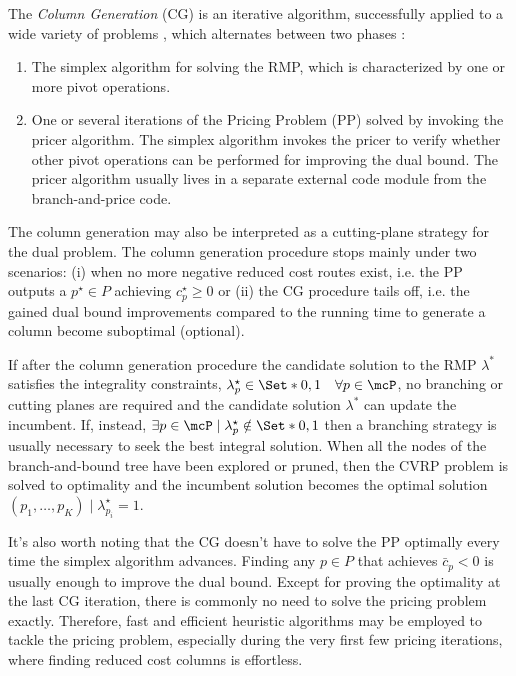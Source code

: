\medskip

The \textit{Column Generation} (CG) is an iterative algorithm,
successfully applied to a wide variety of problems \parencite{desrosiers2005},
which alternates between two phases \parencite{desaulniers2018}:
\begin{enumerate}
	\setlength{\itemsep}{0pt}
	\setlength{\parskip}{0pt}

	\item The simplex algorithm for solving the RMP, which is characterized by one or more pivot operations.
	\item One or several iterations of the Pricing Problem (PP) solved by invoking the pricer algorithm.
	      The simplex algorithm invokes the pricer to verify whether other pivot operations
	      can be performed for improving the dual bound.
	      The pricer algorithm usually lives in a separate external code module from the branch-and-price code.
\end{enumerate}

The column generation may also be interpreted
as a cutting-plane strategy for the dual problem.
The column generation procedure stops mainly under two scenarios:
(i) when no more negative reduced cost routes exist,
i.e. the PP outputs a $p^\star \in P$ achieving $c^\star_p \ge 0$
or
(ii) the CG procedure tails off,
i.e. the gained dual bound improvements
compared to the running time to generate a column
become suboptimal (optional).

If after the column generation procedure
the candidate solution to the RMP $\lambda^*$ satisfies the integrality constraints,
$\lambda^\star_p \in \Set*{0, 1} \quad \forall p \in \mcP$,
no branching or cutting planes are required
and the candidate solution $\lambda^*$ can update the incumbent.
If, instead,
$\exists p \in \mcP \mid \lambda^\star_p \notin \Set*{0, 1}$
then a branching strategy is usually necessary
to seek the best integral solution.
When all the nodes of the branch-and-bound tree have been explored or pruned,
then the CVRP problem is solved to optimality
and the incumbent solution becomes the optimal solution
$(p_1, \dots, p_K) \mid \lambda^\star_{p_i} = 1$.

\medskip

It's also worth noting that
the CG doesn't have to solve the PP optimally
every time the simplex algorithm advances.
Finding any $p \in P$ that achieves $\bar{c}_p < 0$ is usually enough to improve the dual bound.
Except for proving the optimality at the last CG iteration,
there is commonly no need to solve the pricing problem exactly.
Therefore, fast and efficient heuristic algorithms may be employed
to tackle the pricing problem,
especially during the very first few pricing iterations,
where finding reduced cost columns is effortless.

